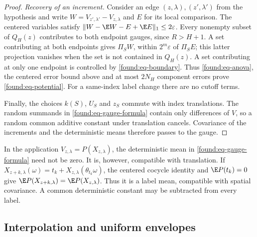 \begin{proof}
\emph{Recovery of an increment.}
Consider an edge $(z,\lambda),(z',\lambda')$ from the hypothesis
and write $W=V_{z',\lambda'}-V_{z,\lambda}$ and $E$ for its local
comparison.  The centered variables satisfy
$\|W-\E W-E+\E E\|_1\leq2\varepsilon$.
Every nonempty subset of $Q_H(z)$ contributes to both endpoint
gauges, since $R>H+1$.  A set contributing at both endpoints gives
$\Pi_SW$, within $2^m\varepsilon$ of $\Pi_SE$; this latter projection
vanishes when the set is not contained in $Q_H(z)$.  A set contributing
at only one endpoint is controlled by \eqref{found:eq-boundary}.
Thus \eqref{found:eq-anova}, the centered error bound above and at
most $2N_H$ component errors prove \eqref{found:eq-potential}.
For a same-index label change there are no cutoff terms.

Finally, the choices $k(S)$, $U_S$ and $z_S$ commute with index
translations.  The random summands in \eqref{found:eq-gauge-formula}
contain only differences of $V$, so a random common additive constant
under translation cancels.  Covariance of the increments and the
deterministic means therefore passes to the gauge.
\end{proof}

\begin{remark}
\label{found:rem-means}
In the application $V_{z,\lambda}=P(X_{z,\lambda})$, the deterministic
mean in \eqref{found:eq-gauge-formula} need not be zero.  It is,
however, compatible with translation.  If
$X_{z+k,\lambda}(\omega)=t_k+X_{z,\lambda}(\theta_{t_k}\omega)$,
the centered cocycle identity and $\E P(t_k)=0$ give
$\E P(X_{z+k,\lambda})=\E P(X_{z,\lambda})$.
Thus it is a label mean, compatible with spatial covariance.  A common
deterministic constant may be subtracted from every label.
\end{remark}

\subsection{Interpolation and uniform envelopes}

